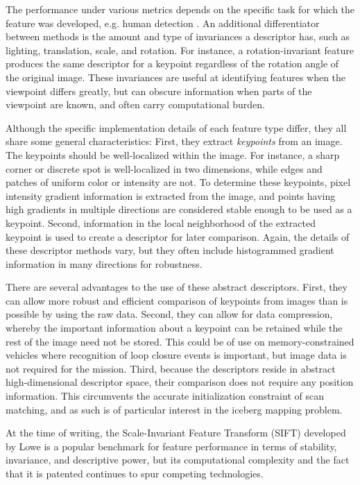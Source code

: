 The performance under various metrics depends on the specific task for which the feature was developed, e.g. human detection \cite{Dalal2005}. An additional differentiator between methods is the amount and type of invariances a descriptor has, such as lighting, translation, scale, and rotation. For instance, a rotation-invariant feature produces the same descriptor for a keypoint regardless of the rotation angle of the original image. These invariances are useful at identifying features when the viewpoint differs greatly, but can obscure information when parts of the viewpoint are known, and often carry computational burden. 

Although the specific implementation details of each feature type differ, they all share some general characteristics: First, they extract \emph{keypoints} from an image. The keypoints should be well-localized within the image. For instance, a sharp corner or discrete spot is well-localized in two dimensions, while edges and patches of uniform color or intensity are not. To determine these keypoints, pixel intensity gradient information is extracted from the image, and points having high gradients in multiple directions are considered stable enough to be used as a keypoint. 
Second, information in the local neighborhood of the extracted keypoint is used to create a descriptor for later comparison. Again, the details of these descriptor methods vary, but they often include histogrammed gradient information in many directions for robustness. 

There are several advantages to the use of these abstract descriptors. First, they can allow more robust and efficient comparison of keypoints from images than is possible by using the raw data. Second, they can allow for data compression, whereby the important information about a keypoint can be retained while the rest of the image need not be stored. This could be of use on memory-constrained vehicles where recognition of loop closure events is important, but image data is not required for the mission. Third, because the descriptors reside in abstract high-dimensional descriptor space, their comparison does not require any position information. This circumvents the accurate initialization constraint of scan matching, and as such is of particular interest in the iceberg mapping problem.

At the time of writing, the Scale-Invariant Feature Transform (SIFT) developed by Lowe \cite{Lowe2004} is a popular benchmark for feature performance in terms of stability, invariance, and descriptive power, but its computational complexity and the fact that it is patented continues to spur competing technologies.

